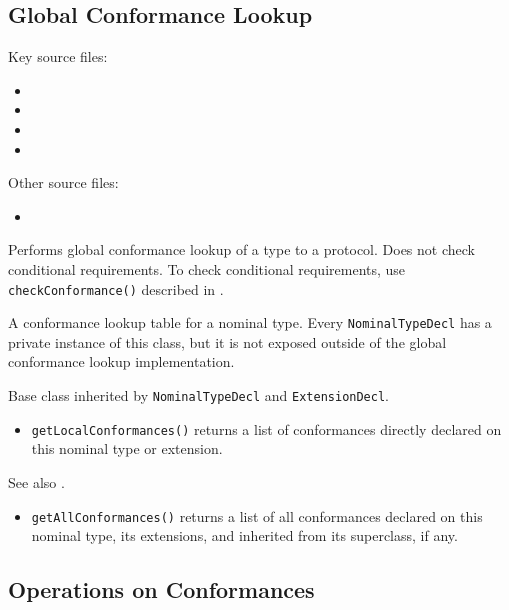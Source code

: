 \documentclass[../generics]{subfiles}
\begin{document}
\subsection*{Global Conformance Lookup}

Key source files:
\begin{itemize}
\item {}
\item {}
\item {}
\item {}
\end{itemize}
Other source files:
\begin{itemize}
\item {}
\end{itemize}

Performs global conformance lookup of a type to a protocol. Does not check conditional requirements. To check conditional requirements, use \texttt{checkConformance()} described in .

A conformance lookup table for a nominal type. Every \texttt{NominalTypeDecl} has a private instance of this class, but it is not exposed outside of the global conformance lookup implementation.

Base class inherited by \texttt{NominalTypeDecl} and \texttt{ExtensionDecl}.
\begin{itemize}
\item \texttt{getLocalConformances()} returns a list of conformances directly declared on this nominal type or extension.
\end{itemize}

See also .
\begin{itemize}
\item \texttt{getAllConformances()} returns a list of all conformances declared on this nominal type, its extensions, and inherited from its superclass, if any.
\end{itemize}

\subsection*{Operations on Conformances}
\end{document}
